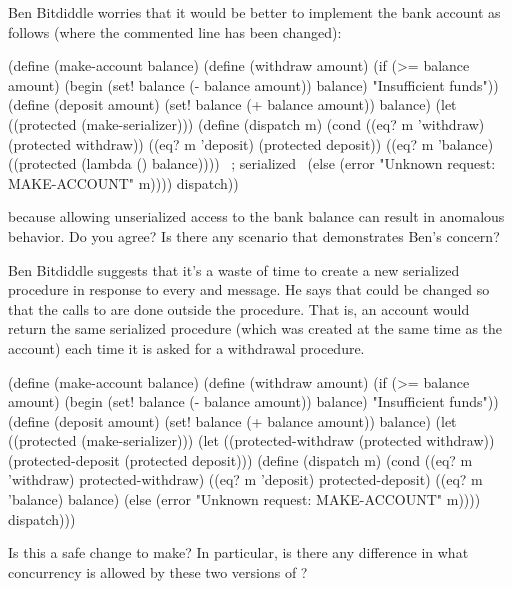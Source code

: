 \begin{exercise}
	\label{Exercise 3.41}
	Ben Bitdiddle worries that it would be better to implement the bank account as follows (where the commented line has been changed):
	\begin{scheme}
	  (define (make-account balance)
	    (define (withdraw amount)
	      (if (>= balance amount)
	          (begin (set! balance
	                       (- balance amount))
	                 balance)
	          "Insufficient funds"))
	    (define (deposit amount)
	      (set! balance (+ balance amount))
	      balance)
	    (let ((protected (make-serializer)))
	      (define (dispatch m)
	        (cond ((eq? m 'withdraw) (protected withdraw))
	              ((eq? m 'deposit) (protected deposit))
	              ((eq? m 'balance)
	               ((protected
	                 (lambda () balance)))) ~\textrm{; serialized}~
	              (else
	               (error "Unknown request: MAKE-ACCOUNT"
	                      m))))
	      dispatch))
	\end{scheme}
	because allowing unserialized access to the bank balance can result in anomalous behavior.
	Do you agree?
	Is there any scenario that demonstrates Ben’s concern?
\end{exercise}



\begin{exercise}
	\label{Exercise 3.42}
	Ben Bitdiddle suggests that it’s a waste of time to create a new serialized procedure in response to every  and  message.
	He says that  could be changed so that the calls to  are done outside the  procedure.
	That is, an account would return the same serialized procedure (which was created at the same time as the account) each time it is asked for a withdrawal procedure.
	\begin{scheme}
	  (define (make-account balance)
	    (define (withdraw amount)
	      (if (>= balance amount)
	          (begin (set! balance (- balance amount))
	                 balance)
	          "Insufficient funds"))
	    (define (deposit amount)
	      (set! balance (+ balance amount))
	      balance)
	    (let ((protected (make-serializer)))
	      (let ((protected-withdraw (protected withdraw))
	            (protected-deposit (protected deposit)))
	        (define (dispatch m)
	          (cond ((eq? m 'withdraw) protected-withdraw)
	                ((eq? m 'deposit) protected-deposit)
	                ((eq? m 'balance) balance)
	                (else
	                 (error "Unknown request: MAKE-ACCOUNT"
	                        m))))
	        dispatch)))
	\end{scheme}
	Is this a safe change to make?
	In particular, is there any difference in what concurrency is allowed by these two versions of ?
\end{exercise}



